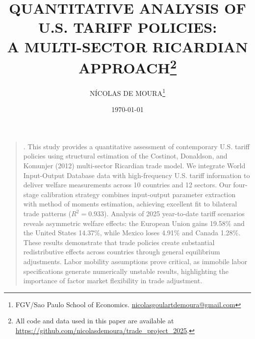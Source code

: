 \documentclass[a4paper, 12pt]{article}
\renewenvironment{abstract}
{\small\begin{quote}\noindent \par{\sc \abstractname.}}
{\noindent\end{quote}}
\begin{document}
\title{\normalsize\MakeUppercase{\bfseries 
 Quantitative Analysis of U.S. Tariff Policies:\\A Multi-Sector Ricardian Approach}\footnote{All code and data used in this paper are available at \url{https://github.com/nicolasdemoura/trade_project_2025}.}}
\date{\footnotesize\MakeUppercase\today}
\author{
    \small\MakeUppercase{Nícolas de Moura}\footnote{FGV/Sao Paulo School of Economics. \href{mailto:nicolasgoulartdemoura@gmail.com}{nicolasgoulartdemoura@gmail.com}}
}
\maketitle

\begin{abstract}
This study provides a quantitative assessment of contemporary U.S. tariff policies using structural estimation of the Costinot, Donaldson, and Komunjer (2012) multi-sector Ricardian trade model. We integrate World Input-Output Database data with high-frequency U.S. tariff information to deliver welfare measurements across 10 countries and 12 sectors. Our four-stage calibration strategy combines input-output parameter extraction with method of moments estimation, achieving excellent fit to bilateral trade patterns ($R^2 = 0.933$). Analysis of 2025 year-to-date tariff scenarios reveals asymmetric welfare effects: the European Union gains 19.58\% and the United States 14.37\%, while Mexico loses 4.91\% and Canada 1.28\%. These results demonstrate that trade policies create substantial redistributive effects across countries through general equilibrium adjustments. Labor mobility assumptions prove critical, as immobile labor specifications generate numerically unstable results, highlighting the importance of factor market flexibility in trade adjustment.
\end{abstract}









\newpage



\newpage


% 
%
\end{document}
